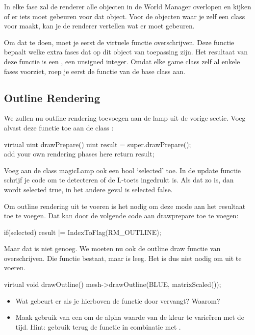 In elke fase zal de renderer alle objecten in de World Manager overlopen en kijken of er iets moet gebeuren voor dat object. Voor de objecten waar je zelf een class voor maakt, kan je de renderer vertellen wat er moet gebeuren.

Om dat te doen, moet je eerst de virtuele functie  overschrijven. Deze functie bepaalt welke extra fases dat op dit object van toepassing zijn. Het resultaat van deze functie is een , een unsigned integer. Omdat elke game class zelf al enkele fases voorziet, roep je eerst de  functie van de base class aan.

\subsection{Outline Rendering}
We zullen nu outline rendering toevoegen aan de lamp uit de vorige sectie. Voeg alvast deze functie toe aan de class :

\begin{code}
virtual uint drawPrepare()
{
	uint result = super.drawPrepare();
	\\ add your own rendering phases here
	return result;
}
\end{code}

\begin{exercise}
Voeg aan de class magicLamp ook een bool `selected' toe. In de update functie schrijf je code om te detecteren of de L-toets ingedrukt is. Als dat zo is, dan wordt selected true, in het andere geval is selected false.
\end{exercise}

Om outline rendering uit te voeren is het nodig om deze mode aan het resultaat toe te voegen. Dat kan door de volgende code aan drawprepare toe te voegen:

\begin{code}
if(selected) {
	 result |= IndexToFlag(RM_OUTLINE);
}
\end{code}

Maar dat is niet genoeg. We moeten nu ook de outline draw functie van  overschrijven. Die functie bestaat, maar is leeg. Het is dus niet nodig om  uit te voeren.

\begin{code}
virtual void drawOutline()
{
	mesh->drawOutline(BLUE, matrixScaled());
}
\end{code} 

\begin{exercise}
\begin{itemize}
\item Wat gebeurt er als je hierboven de functie  door  vervangt? Waarom?
\item Maak gebruik van een  om de alpha waarde van de kleur te varie\"eren met de tijd. Hint: gebruik terug de functie  in combinatie met .
\end{itemize}
\end{exercise}

